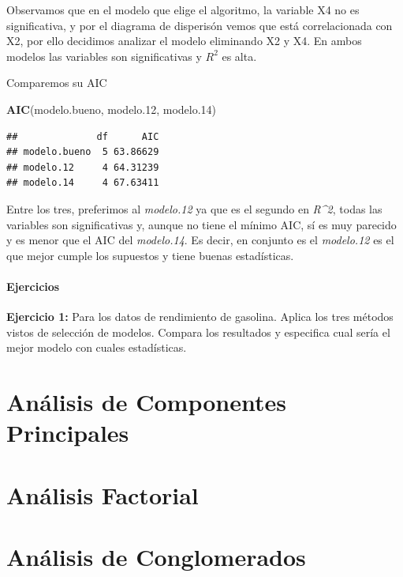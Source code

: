 \documentclass[
]{book}
\newenvironment{Shaded}{\begin{snugshade}}{\end{snugshade}}
\newcommand{\FloatTok}[1]{\textcolor[rgb]{0.00,0.00,0.81}{#1}}
\newcommand{\FunctionTok}[1]{\textcolor[rgb]{0.13,0.29,0.53}{\textbf{#1}}}
\newcommand{\NormalTok}[1]{#1}
\begin{document}
Observamos que en el modelo que elige el algoritmo, la variable X4 no es significativa, y por el diagrama de disperisón vemos que está correlacionada con X2, por ello decidimos analizar el modelo eliminando X2 y X4. En ambos modelos las variables son significativas y \(R^2\) es alta.

Comparemos su AIC

\begin{Shaded}
\begin{Highlighting}[]
\FunctionTok{AIC}\NormalTok{(modelo.bueno, modelo}\FloatTok{.12}\NormalTok{, modelo}\FloatTok{.14}\NormalTok{)}
\end{Highlighting}
\end{Shaded}

\begin{verbatim}
##              df      AIC
## modelo.bueno  5 63.86629
## modelo.12     4 64.31239
## modelo.14     4 67.63411
\end{verbatim}

Entre los tres, preferimos al \emph{modelo.12} ya que es el segundo en \emph{R\^{}2}, todas las variables son significativas y, aunque no tiene el mínimo AIC, sí es muy parecido y es menor que el AIC del \emph{modelo.14}. Es decir, en conjunto es el \emph{modelo.12} es el que mejor cumple los supuestos y tiene buenas estadísticas.

\subsubsection{Ejercicios}\label{ejercicios-4}

\textbf{Ejercicio 1:} Para los datos de rendimiento de gasolina. Aplica los tres métodos vistos de selección de modelos. Compara los resultados y especifica cual sería el mejor modelo con cuales estadísticas.

\chapter{Análisis de Componentes Principales}\label{anuxe1lisis-de-componentes-principales}

\chapter{Análisis Factorial}\label{anuxe1lisis-factorial}

\chapter{Análisis de Conglomerados}\label{anuxe1lisis-de-conglomerados}
\end{document}
